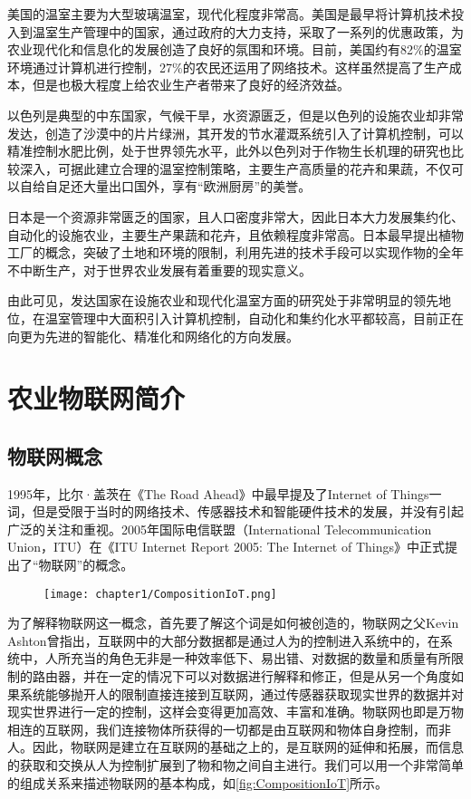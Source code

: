 美国的温室主要为大型玻璃温室，现代化程度非常高。美国是最早将计算机技术投入到温室生产管理中的国家，通过政府的大力支持，采取了一系列的优惠政策，为农业现代化和信息化的发展创造了良好的氛围和环境。目前，美国约有82\%的温室环境通过计算机进行控制，27\%的农民还运用了网络技术。这样虽然提高了生产成本，但是也极大程度上给农业生产者带来了良好的经济效益。

以色列是典型的中东国家，气候干旱，水资源匮乏，但是以色列的设施农业却非常发达，创造了沙漠中的片片绿洲，其开发的节水灌溉系统引入了计算机控制，可以精准控制水肥比例，处于世界领先水平，此外以色列对于作物生长机理的研究也比较深入，可据此建立合理的温室控制策略，主要生产高质量的花卉和果蔬，不仅可以自给自足还大量出口国外，享有“欧洲厨房”的美誉。

日本是一个资源非常匮乏的国家，且人口密度非常大，因此日本大力发展集约化、自动化的设施农业，主要生产果蔬和花卉，且依赖程度非常高。日本最早提出植物工厂的概念，突破了土地和环境的限制，利用先进的技术手段可以实现作物的全年不中断生产，对于世界农业发展有着重要的现实意义。

由此可见，发达国家在设施农业和现代化温室方面的研究处于非常明显的领先地位，在温室管理中大面积引入计算机控制，自动化和集约化水平都较高，目前正在向更为先进的智能化、精准化和网络化的方向发展。

\section{农业物联网简介}
	\subsection{物联网概念}
	1995年，比尔·盖茨在《The Road Ahead》中最早提及了Internet of Things一词，但是受限于当时的网络技术、传感器技术和智能硬件技术的发展，并没有引起广泛的关注和重视。2005年国际电信联盟（International Telecommunication Union，ITU）在《ITU Internet Report 2005: The Internet of Things》中正式提出了“物联网”的概念。
	
	\begin{figure}[!htp]
  		\centering
 		\texttt{[image: chapter1/CompositionIoT.png]}
	\end{figure}
	
	为了解释物联网这一概念，首先要了解这个词是如何被创造的，物联网之父Kevin Ashton曾指出，互联网中的大部分数据都是通过人为的控制进入系统中的，在系统中，人所充当的角色无非是一种效率低下、易出错、对数据的数量和质量有所限制的路由器，并在一定的情况下可以对数据进行解释和修正，但是从另一个角度如果系统能够抛开人的限制直接连接到互联网，通过传感器获取现实世界的数据并对现实世界进行一定的控制，这样会变得更加高效、丰富和准确。物联网也即是万物相连的互联网，我们连接物体所获得的一切都是由互联网和物体自身控制，而非人。因此，物联网是建立在互联网的基础之上的，是互联网的延伸和拓展，而信息的获取和交换从人为控制扩展到了物和物之间自主进行。我们可以用一个非常简单的组成关系来描述物联网的基本构成，如\ref{fig:CompositionIoT}所示。
	
